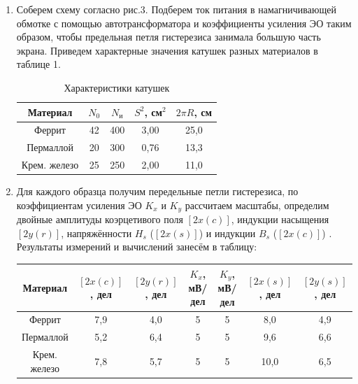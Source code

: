 \documentclass[a4paper,12pt]{article} %
\begin{document}
\begin{enumerate}


\item Соберем схему согласно рис.3. Подберем ток питания в намагничивающей обмотке с помощью автотрансформатора и коэффициенты усиления ЭО таким образом, чтобы предельная петля гистерезиса занимала большую часть экрана. Приведем характерные значения катушек разных материалов в таблице 1.

  \begin{table}[H]
    \centering
    \begin{tabular}{|c|c|c|c|c|}
      \hline
      Материал     & $N_0$ & $N_\text{и}$ & $S^2$, см$^2$ & $2\pi R$, см \\ \hline
      Феррит       & 42    & 400                              & 3,00           & 25,0         \\ \hline
      Пермаллой    & 20    & 300                             & 0,76          & 13,3         \\ \hline
      Крем. железо & 25    & 250                             & 2,00          & 11,0         \\ \hline
    \end{tabular}
    \caption{Характеристики катушек}
    \label{tab:har_kat}
  \end{table}

\item Для каждого образца получим передельные петли гистерезиса, по коэффициентам усиления ЭО $K_x$ и $K_y$ рассчитаем масштабы, определим двойные амплитуды коэрцетивого поля $ [2x(c)] $, индукции насыщения $ [2y(r)]$, напряжённости $H_{s}$ ($ [2x(s)] $) и индукции $B_{s}$ ($ [2x(c)] $) . Результаты измерений и вычислений занесём в таблицу:

  \begin{table}
    \centering
    \begin{tabular}{|c|c|c|c|c|c|c|}
      \hline
      Материал     & $[2x(c)]$, дел & $[2y(r)]$, дел & $K_x$, мВ/дел & $K_y$, мВ/дел & $[2x(s)]$, дел  & $[2y(s)]$, дел \\ \hline
      Феррит       & 7,9            & 4,0            & 5            & 5    & 8,0 & 4,9 \\ \hline
      Пермаллой    & 5,2           & 6,4            & 5            & 5     &  9,6  & 6,6     \\ \hline
      Крем. железо & 7,8            & 5,7           & 5           & 5     & 10,0 & 6,5   \\ \hline
    \end{tabular}
  \end{table}


\end{enumerate}
\end{document}
